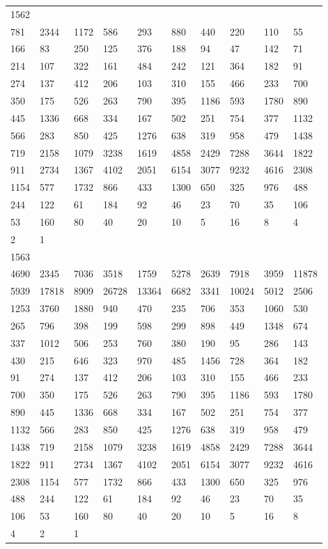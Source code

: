 \begin{longtable}{*{10}{l}}
1562&&&&&&&&&\\
781& 2344& 1172& 586& 293& 880& 440& 220& 110& 55\\
166& 83& 250& 125& 376& 188& 94& 47& 142& 71\\
214& 107& 322& 161& 484& 242& 121& 364& 182& 91\\
274& 137& 412& 206& 103& 310& 155& 466& 233& 700\\
350& 175& 526& 263& 790& 395& 1186& 593& 1780& 890\\
445& 1336& 668& 334& 167& 502& 251& 754& 377& 1132\\
566& 283& 850& 425& 1276& 638& 319& 958& 479& 1438\\
719& 2158& 1079& 3238& 1619& 4858& 2429& 7288& 3644& 1822\\
911& 2734& 1367& 4102& 2051& 6154& 3077& 9232& 4616& 2308\\
1154& 577& 1732& 866& 433& 1300& 650& 325& 976& 488\\
244& 122& 61& 184& 92& 46& 23& 70& 35& 106\\
53& 160& 80& 40& 20& 10& 5& 16& 8& 4\\
2& 1& \\

1563&&&&&&&&&\\
4690& 2345& 7036& 3518& 1759& 5278& 2639& 7918& 3959& 11878\\
5939& 17818& 8909& 26728& 13364& 6682& 3341& 10024& 5012& 2506\\
1253& 3760& 1880& 940& 470& 235& 706& 353& 1060& 530\\
265& 796& 398& 199& 598& 299& 898& 449& 1348& 674\\
337& 1012& 506& 253& 760& 380& 190& 95& 286& 143\\
430& 215& 646& 323& 970& 485& 1456& 728& 364& 182\\
91& 274& 137& 412& 206& 103& 310& 155& 466& 233\\
700& 350& 175& 526& 263& 790& 395& 1186& 593& 1780\\
890& 445& 1336& 668& 334& 167& 502& 251& 754& 377\\
1132& 566& 283& 850& 425& 1276& 638& 319& 958& 479\\
1438& 719& 2158& 1079& 3238& 1619& 4858& 2429& 7288& 3644\\
1822& 911& 2734& 1367& 4102& 2051& 6154& 3077& 9232& 4616\\
2308& 1154& 577& 1732& 866& 433& 1300& 650& 325& 976\\
488& 244& 122& 61& 184& 92& 46& 23& 70& 35\\
106& 53& 160& 80& 40& 20& 10& 5& 16& 8\\
4& 2& 1& \\


\end{longtable}
